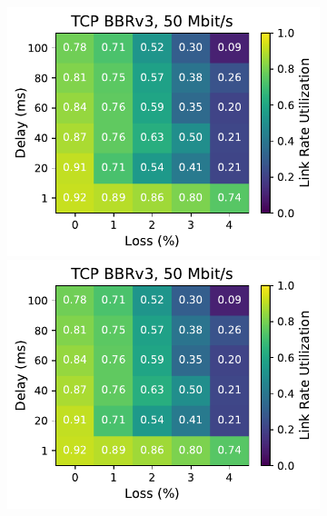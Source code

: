 \begin{figure}[ht]
\begin{subfigure}[b]{1cm}
        \includegraphics[width=\linewidth,trim={8cm 0 0 0},clip]{figures/heatmaps/heatmap_tcp_bbr3_50mbps.pdf}
        \vspace*{0.22cm}
        \includegraphics[width=\linewidth,trim={8cm 0 0 0},clip]{figures/heatmaps/heatmap_tcp_bbr3_50mbps.pdf}
        \vspace*{0.22cm}

\end{subfigure}
\end{figure}
